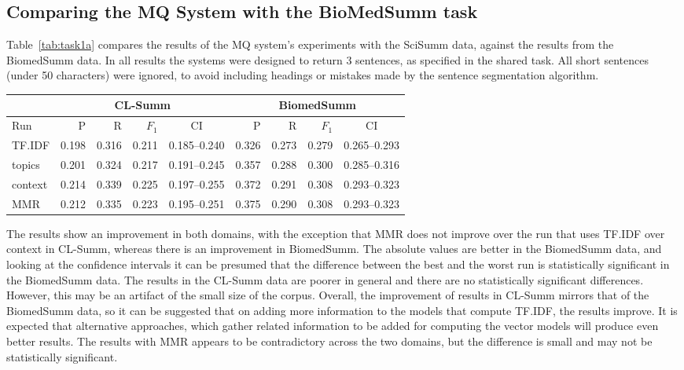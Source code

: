 \documentclass[11pt]{article}
\begin{document}
\subsection{Comparing the MQ System with the BioMedSumm task}
Table~\ref{tab:task1a} compares the results of the MQ system's experiments 
with the SciSumm data, against the results from the BiomedSumm data. In all 
results the systems were designed to return 3 sentences, as specified in the 
shared task. All short sentences (under 50 characters) were ignored, to avoid 
including headings or mistakes made by the sentence segmentation algorithm.

\begin{table*}
  \centering
  \begin{tabular}{|l|r|r|r|c|r|r|r|c|}
  	\hline
	& \multicolumn{4}{|c|}{CL-Summ} & \multicolumn{4}{|c|}{BiomedSumm}\\
	\hline
	Run & P & R & $F_1$ & CI & P & R & $F_1$ & CI\\
	\hline
    TF.IDF & 0.198 & 0.316 & 0.211 & 0.185--0.240 & 0.326 & 0.273 & 0.279 & 0.265--0.293\\
	topics & 0.201 & 0.324 & 0.217 & 0.191--0.245 & 0.357 & 0.288 & 0.300
	& 0.285--0.316\\
	context & 0.214 & 0.339 & 0.225 & 0.197--0.255 & 0.372 & 0.291 & 0.308
	& 0.293--0.323\\
	MMR & 0.212 & 0.335 & 0.223 & 0.195--0.251 &  0.375 & 0.290 & 0.308 & 0.293--0.323\\ 
	\hline
  \end{tabular}
  \caption{ROUGE-L results of the MQ system runs for Task 1A.}
  \label{tab:task1a}
\end{table*}

The results show an improvement in both domains, with the exception
that MMR does not improve over the run that uses TF.IDF over context
in CL-Summ, whereas there is an improvement in BiomedSumm. The
absolute values are better in the BiomedSumm data, and looking at the
confidence intervals it can be presumed that the difference between
the best and the worst run is statistically significant in the
BiomedSumm data. The results in the CL-Summ data are poorer in general
and there are no statistically significant differences. However, this
may be an artifact of the small size of the corpus.  Overall, the
improvement of results in CL-Summ mirrors that of the BiomedSumm data,
so it can be suggested that on adding more information to the models
that compute TF.IDF, the results improve. It is expected that
alternative approaches, which gather related information to be added
for computing the vector models will produce even better results. The
results with MMR appears to be contradictory across the two domains,
but the difference is small and may not be statistically significant.
\end{document}
